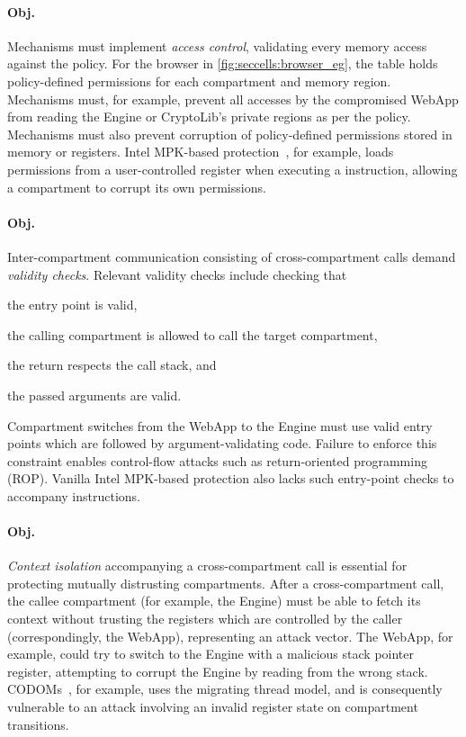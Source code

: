 \paragraph{Obj. }
Mechanisms must implement \emph{access control},
validating every memory access against the policy.
For the browser in \autoref{fig:seccells:browser_eg}, the table
holds policy-defined permissions for each compartment and memory region.
Mechanisms must, for example, prevent all accesses by the compromised
WebApp from reading the Engine or CryptoLib's private regions as per the
policy.
Mechanisms must also prevent corruption of policy-defined permissions
stored in memory or registers.
Intel MPK-based protection~\cite{ParkLXMK19}, for example, loads
permissions from a user-controlled register when executing a
 instruction, allowing a compartment to corrupt its 
own permissions.

\paragraph{Obj. }
Inter-compartment communication consisting of cross-compartment calls 
demand \emph{validity checks}.
Relevant validity checks include checking that 
\begin{inparaenum}
  \item the entry point is valid,
  \item the calling compartment is allowed to call the target compartment, 
  \item the return respects the call stack, and
  \item the passed arguments are valid.
\end{inparaenum}
Compartment switches from the WebApp to the Engine must use valid entry
points which are followed by argument-validating code. Failure to enforce this
constraint enables
control-flow attacks such as return-oriented programming (ROP).
Vanilla Intel MPK-based protection also lacks such entry-point checks
to accompany  instructions.

\paragraph{Obj. }
\emph{Context isolation} accompanying a cross-compartment call is 
essential for protecting mutually distrusting compartments.
After a cross-compartment call, the callee compartment (for example, the Engine) 
must be able to fetch its context without trusting the registers which
are controlled by the caller (correspondingly, the WebApp), 
representing an attack vector.
The WebApp, for example, could try to switch to the Engine with a malicious stack pointer
register, attempting to corrupt the Engine by reading from the wrong stack.
CODOMs~\cite{VilanovaBNEV14}, for example, uses the migrating thread model,
and is consequently vulnerable to an attack involving an invalid register state
on compartment transitions.

